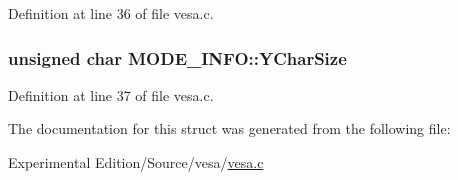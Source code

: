 Definition at line 36 of file vesa.\+c.

\subsubsection[{\texorpdfstring{Y\+Char\+Size}{YCharSize}}]{\setlength{\rightskip}{0pt plus 5cm}unsigned char M\+O\+D\+E\+\_\+\+I\+N\+F\+O\+::\+Y\+Char\+Size}\hypertarget{structMODE__INFO_a818ddf6ff3ca5e5b45f76478f5813ac2}{}\label{structMODE__INFO_a818ddf6ff3ca5e5b45f76478f5813ac2}


Definition at line 37 of file vesa.\+c.



The documentation for this struct was generated from the following file\+:\begin{DoxyCompactItemize}
\item 
Experimental Edition/\+Source/vesa/\hyperlink{vesa_8c}{vesa.\+c}\end{DoxyCompactItemize}
